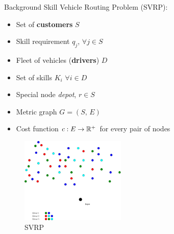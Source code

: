 \begin{frame}[t]{Background}
    Skill Vehicle Routing Problem (SVRP):
    \begin{minipage}[t]{0.48\textwidth}
        \begin{itemize}
            \item<1-> Set of \textbf{customers} $S$
            \item<2-> Skill requirement $q_j$,  $\forall j \in S$
            \item<3-> Fleet of vehicles (\textbf{drivers}) $D$
            \item<4-> Set of skills $K_i$ $\forall i \in D$
            \item<5-> Special node \emph{depot}, $r \in S$
            \item<6-> Metric graph $G = (S, \, E)$
            \item<7-> Cost function $c:E \rightarrow \mathbb{R}^+$ for every pair of nodes
        \end{itemize}
    \end{minipage}
    \begin{minipage}[t]{0.48\textwidth}
        \begin{figure}
            \centering
            \includegraphics[width=5cm]{VRPSS01.pdf}
            \caption{SVRP}
            \label{fig:VRPSS01}
        \end{figure}            
    \end{minipage}
\end{frame}

